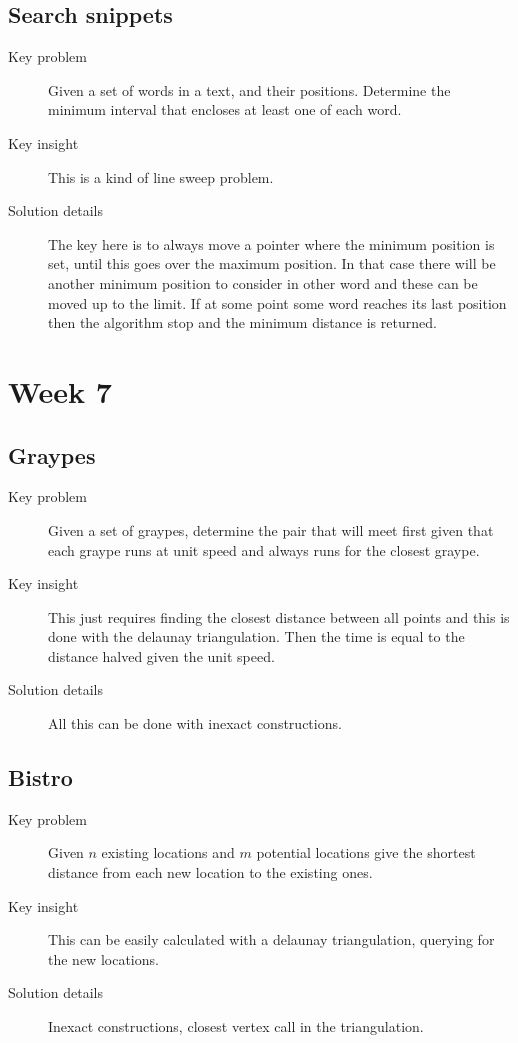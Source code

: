 \documentclass[11pt]{book}
\begin{document}
\subsection{Search snippets}

\begin{description}
	\item[Key problem] Given a set of words in a text, and their positions. Determine the minimum interval that encloses at least one of each word.
	\item[Key insight] This is a kind of line sweep problem.
	\item[Solution details] The key here is to always move a pointer where the minimum position is set, until this goes over the maximum position. In that case there will be another minimum position to consider in other word and these can be moved up to the limit. If at some point some word reaches its last position then the algorithm stop and the minimum distance is returned.
\end{description}

\section{Week 7}

\subsection{Graypes}

\begin{description}
	\item[Key problem] Given a set of graypes, determine the pair that will meet first given that each graype runs at unit speed and always runs for the closest graype.
	\item[Key insight] This just requires finding the closest distance between all points and this is done with the delaunay triangulation. Then the time is equal to the distance halved given the unit speed.
	\item[Solution details] All this can be done with inexact constructions.
\end{description}

\subsection{Bistro}

\begin{description}
	\item[Key problem] Given $n$ existing locations and $m$ potential locations give the shortest distance from each new location to the existing ones.
	\item[Key insight] This can be easily calculated with a delaunay triangulation, querying for the new locations.
	\item[Solution details] Inexact constructions, closest vertex call in the triangulation.
\end{description}
\end{document}
